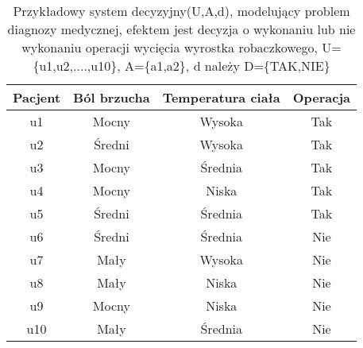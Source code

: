 \documentclass[a4paper]{article}
\begin{document}
\begin{table}[h]
\centering\caption{Przykładowy system decyzyjny(U,A,d), modelujący problem diagnozy medycznej,  efektem jest decyzja o wykonaniu lub nie wykonaniu operacji wycięcia wyrostka robaczkowego, U=\{u1,u2,....,u10\}, A=\{a1,a2\}, d należy D=\{TAK,NIE\}}
\begin{tabular}{c| c c c}
\hline
\hline
Pacjent & Ból brzucha & Temperatura ciała & Operacja\\
\hline
u1 & Mocny & Wysoka & Tak\\
u2 & Średni & Wysoka & Tak\\
u3 & Mocny & Średnia & Tak\\
u4 & Mocny & Niska & Tak\\
u5 & Średni & Średnia & Tak\\
u6 & Średni & Średnia & Nie\\
u7 & Mały & Wysoka & Nie\\
u8 & Mały & Niska & Nie\\
u9 & Mocny & Niska & Nie\\
u10 & Mały & Średnia & Nie\\

\hline
\hline
\end{tabular}
\end{table}
\end{document}
